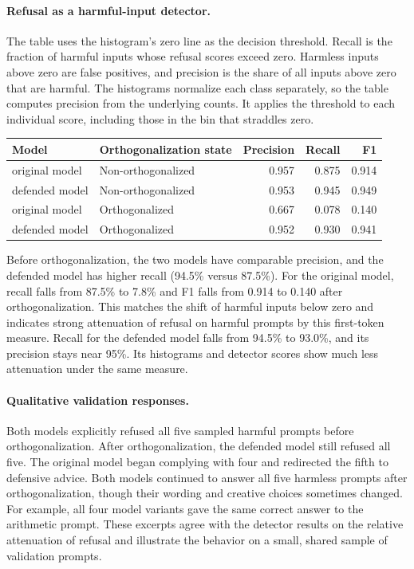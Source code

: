\documentclass[10pt,letterpaper]{article}
\begin{document}
\paragraph{Refusal as a harmful-input detector.}
The table uses the histogram's zero line as the decision threshold. Recall is the fraction of harmful inputs whose refusal scores exceed zero. Harmless inputs above zero are false positives, and precision is the share of all inputs above zero that are harmful. The histograms normalize each class separately, so the table computes precision from the underlying counts. It applies the threshold to each individual score, including those in the bin that straddles zero.

\begin{center}
\begin{tabular}{llrrr}
\hline
Model & Orthogonalization state & Precision & Recall & F1 \\
\hline
original model & Non-orthogonalized & 0.957 & 0.875 & 0.914 \\
defended model & Non-orthogonalized & 0.953 & 0.945 & 0.949 \\
original model & Orthogonalized & 0.667 & 0.078 & 0.140 \\
defended model & Orthogonalized & 0.952 & 0.930 & 0.941 \\
\hline
\end{tabular}
\end{center}

Before orthogonalization, the two models have comparable precision, and the defended model has higher recall (94.5\% versus 87.5\%). For the original model, recall falls from 87.5\% to 7.8\% and F1 falls from 0.914 to 0.140 after orthogonalization. This matches the shift of harmful inputs below zero and indicates strong attenuation of refusal on harmful prompts by this first-token measure. Recall for the defended model falls from 94.5\% to 93.0\%, and its precision stays near 95\%. Its histograms and detector scores show much less attenuation under the same measure.

\paragraph{Qualitative validation responses.}
Both models explicitly refused all five sampled harmful prompts before orthogonalization. After orthogonalization, the defended model still refused all five. The original model began complying with four and redirected the fifth to defensive advice. Both models continued to answer all five harmless prompts after orthogonalization, though their wording and creative choices sometimes changed. For example, all four model variants gave the same correct answer to the arithmetic prompt. These excerpts agree with the detector results on the relative attenuation of refusal and illustrate the behavior on a small, shared sample of validation prompts.
\end{document}
